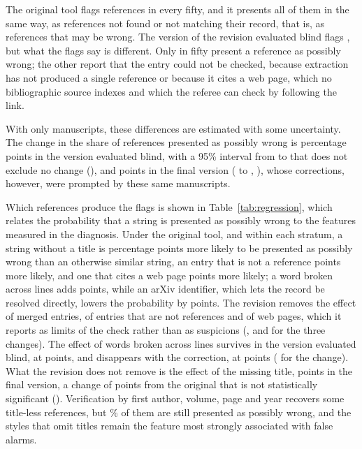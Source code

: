 \documentclass[pdflatex,sn-apa]{sn-jnl}
\begin{document}
The original tool flags \CorpFlagFiftyBase{} references in every fifty, and it presents all of them in the same way, as references not found or not matching their record, that is, as references that may be wrong. The version of the revision evaluated blind flags \CorpFlagFiftyRevBlind{}, but what the flags say is different. Only \CorpScrutFiftyRevBlind{} in fifty present a reference as possibly wrong; the other \CorpLimitFiftyRevBlind{} report that the entry could not be checked, because extraction has not produced a single reference or because it cites a web page, which no bibliographic source indexes and which the referee can check by following the link.

With only \CorpMss{} manuscripts, these differences are estimated with some uncertainty. The change in the share of references presented as possibly wrong is \CorpDiffRevBlind{} percentage points in the version evaluated blind, with a 95\% interval from \CorpDiffRevBlindLo{} to \CorpDiffRevBlindHi{} that does not exclude no change (\CorpDiffRevBlindP{}), and \CorpDiffRev{} points in the final version (\CorpDiffRevLo{} to \CorpDiffRevHi{}, \CorpDiffRevP{}), whose corrections, however, were prompted by these same manuscripts.

Which references produce the flags is shown in Table~\ref{tab:regression}, which relates the probability that a string is presented as possibly wrong to the features measured in the diagnosis. Under the original tool, and within each stratum, a string without a title is \RegBaseNoTitle{} percentage points more likely to be presented as possibly wrong than an otherwise similar string, an entry that is not a reference \RegBaseNotRef{} points more likely, and one that cites a web page \RegBaseWeb{} points more likely; a word broken across lines adds \RegBaseHyphen{} points, while an arXiv identifier, which lets the record be resolved directly, lowers the probability by \RegBaseArxivAbs{} points. The revision removes the effect of merged entries, of entries that are not references and of web pages, which it reports as limits of the check rather than as suspicions (\RegChangeRevMergedP{}, \RegChangeRevNotRefP{} and \RegChangeRevWebP{} for the three changes). The effect of words broken across lines survives in the version evaluated blind, at \RegRevBlindHyphen{} points, and disappears with the correction, at \RegRevHyphen{} points (\RegChangeRevHyphenP{} for the change). What the revision does not remove is the effect of the missing title, \RegRevNoTitle{} points in the final version, a change of \RegChangeRevNoTitle{} points from the original that is not statistically significant (\RegChangeRevNoTitleP{}). Verification by first author, volume, page and year recovers some title-less references, but \RegRevNoTitleRate{}\% of them are still presented as possibly wrong, and the styles that omit titles remain the feature most strongly associated with false alarms.
\end{document}
